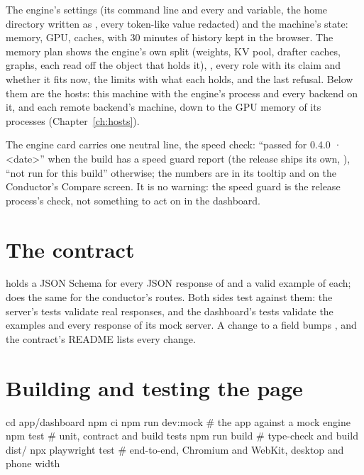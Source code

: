 The engine's settings (its command line and every  and  variable, the home directory written as \code{~}, every token-like value redacted) and the machine's state: memory, GPU, caches, with 30 minutes of history kept in the browser. The memory plan shows the engine's own split (weights, KV pool, drafter caches, graphs, each read off the object that holds it), , every role with its claim and whether it fits now, the limits with what each holds, and the last refusal. Below them are the hosts: this machine with the engine's process and every backend on it, and each remote backend's machine, down to the GPU memory of its processes (Chapter~\ref{ch:hosts}).

The engine card carries one neutral line, the speed check: \enquote{passed for 0.4.0 · <date>} when the build has a speed guard report (the release ships its own, ), \enquote{not run for this build} otherwise; the numbers are in its tooltip and on the Conductor's Compare screen. It is no warning: the speed guard is the release process's check, not something to act on in the dashboard.


\section{The contract}

 holds a JSON Schema for every JSON response of  and a valid example of each;  does the same for the conductor's routes. Both sides test against them: the server's tests validate real responses, and the dashboard's tests validate the examples and every response of its mock server. A change to a field bumps , and the contract's README lists every change.

\section{Building and testing the page}

\begin{shell}
cd app/dashboard
npm ci
npm run dev:mock        # the app against a mock engine
npm test                # unit, contract and build tests
npm run build           # type-check and build dist/
npx playwright test     # end-to-end, Chromium and WebKit, desktop and phone width
\end{shell}

